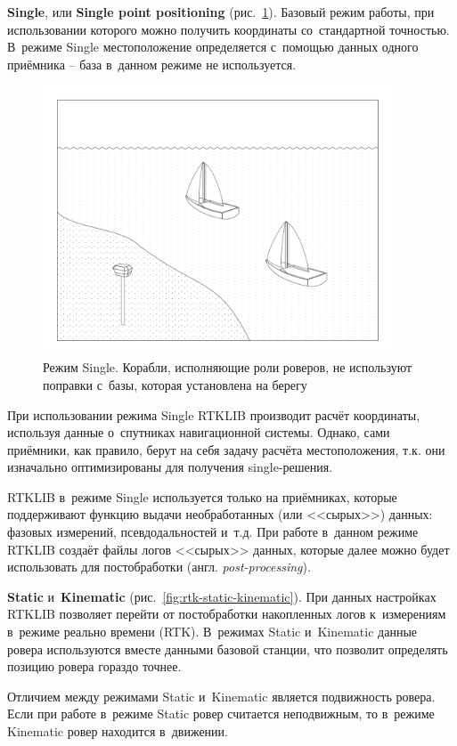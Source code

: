 \begin{dashitemize}
  \item \textbf{Single}, или \textbf{Single point positioning} (рис.~\ref{fig:rtk-single}). Базовый режим работы, при использовании которого можно получить координаты со~стандартной точностью. В~режиме Single местоположение определяется с~помощью данных одного приёмника -- база в~данном режиме не используется. \par
  
  \begin{figure}[h!]
    \centering
    \setlength{\fboxsep}{5pt}
    \includegraphics[height=8cm]{img/tikz/rtk-single/pic}
    \caption{Режим Single. Корабли, исполняющие роли роверов, не используют поправки с~базы, которая установлена на берегу}\label{fig:rtk-single}
  \end{figure}

  При использовании режима Single RTKLIB производит расчёт координаты, используя данные о~спутниках навигационной системы. Однако, сами приёмники, как правило, берут на себя задачу расчёта местоположения, т.к. они изначально оптимизированы для получения single-решения. \par
  RTKLIB в~режиме Single используется только на приёмниках, которые поддерживают функцию выдачи необработанных (или <<сырых>>) данных: фазовых измерений, псевдодальностей и~т.д. При работе в~данном режиме RTKLIB создаёт файлы логов <<сырых>> данных, которые далее можно будет использовать для постобработки (англ. \emph{post-processing}).
  
  \item \textbf{Static} и~\textbf{Kinematic} (рис.~\ref{fig:rtk-static-kinematic}). При данных настройках RTKLIB позволяет перейти от постобработки накопленных логов к~измерениям в~режиме реально времени (RTK). В~режимах Static и~Kinematic данные ровера используются вместе данными базовой станции, что позволит определять позицию ровера гораздо точнее. \par
  Отличием между режимами Static и~Kinematic является подвижность ровера. Если при работе в~режиме Static ровер считается неподвижным, то в~режиме Kinematic ровер находится в~движении. \par
  

\end{dashitemize}

